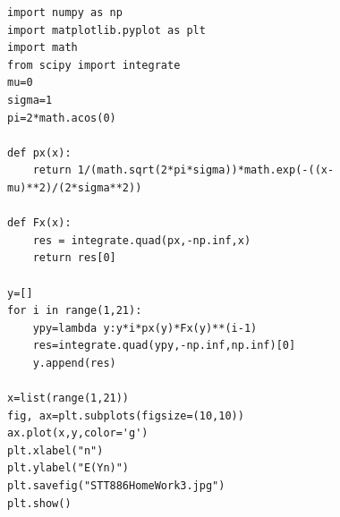 \documentclass{article}
\begin{document}
\begin{verbatim}
import numpy as np
import matplotlib.pyplot as plt
import math
from scipy import integrate
mu=0
sigma=1
pi=2*math.acos(0)

def px(x):
    return 1/(math.sqrt(2*pi*sigma))*math.exp(-((x-mu)**2)/(2*sigma**2))

def Fx(x):
    res = integrate.quad(px,-np.inf,x)
    return res[0]

y=[]
for i in range(1,21):
    ypy=lambda y:y*i*px(y)*Fx(y)**(i-1)
    res=integrate.quad(ypy,-np.inf,np.inf)[0]
    y.append(res)

x=list(range(1,21))
fig, ax=plt.subplots(figsize=(10,10))
ax.plot(x,y,color='g')
plt.xlabel("n")
plt.ylabel("E(Yn)")
plt.savefig("STT886HomeWork3.jpg")
plt.show()

\end{verbatim}
\end{document}
